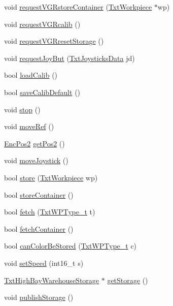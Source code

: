 \begin{DoxyCompactItemize}
\item 
void \hyperlink{classft_1_1_txt_high_bay_warehouse_a4321b39920184a1147017651286735dc}{request\+V\+G\+Rstore\+Container} (\hyperlink{classft_1_1_txt_workpiece}{Txt\+Workpiece} $\ast$wp)
\item 
void \hyperlink{classft_1_1_txt_high_bay_warehouse_a6556c4e1b0c1694a4e791f8bd66a6a11}{request\+V\+G\+Rcalib} ()
\item 
void \hyperlink{classft_1_1_txt_high_bay_warehouse_a1d0b36be0177afb2675db7354240d27a}{request\+V\+G\+Rreset\+Storage} ()
\item 
void \hyperlink{classft_1_1_txt_high_bay_warehouse_a54653fd5c84c7cbd7fd684511f4ca800}{request\+Joy\+But} (\hyperlink{classft_1_1_txt_joysticks_data}{Txt\+Joysticks\+Data} jd)
\item 
bool \hyperlink{classft_1_1_txt_high_bay_warehouse_a2a08665e626da0c946461e5df89937c2}{load\+Calib} ()
\item 
bool \hyperlink{classft_1_1_txt_high_bay_warehouse_ae6deca6a80680d0d563fde5296b618cb}{save\+Calib\+Default} ()
\item 
void \hyperlink{classft_1_1_txt_high_bay_warehouse_a486b766d3f8f11a023daee496429faf0}{stop} ()
\item 
void \hyperlink{classft_1_1_txt_high_bay_warehouse_ae18724814f18d63433a00058622c29bd}{move\+Ref} ()
\item 
\hyperlink{classft_1_1_enc_pos2}{Enc\+Pos2} \hyperlink{classft_1_1_txt_high_bay_warehouse_a1fcf0e88756f2665516b7e15cf4176a4}{get\+Pos2} ()
\item 
void \hyperlink{classft_1_1_txt_high_bay_warehouse_aa73dd2693ee1c2487509b7c82d9a1009}{move\+Joystick} ()
\item 
bool \hyperlink{classft_1_1_txt_high_bay_warehouse_afed1cdc629d97c3776acd48fbc737780}{store} (\hyperlink{classft_1_1_txt_workpiece}{Txt\+Workpiece} wp)
\item 
bool \hyperlink{classft_1_1_txt_high_bay_warehouse_adf0ee6b1f8ef44a317fb360de6ad0cc6}{store\+Container} ()
\item 
bool \hyperlink{classft_1_1_txt_high_bay_warehouse_aa7c22f329269e06c5f8c7bfa8ef16271}{fetch} (\hyperlink{namespaceft_a2d5bf01b2da29de3c061682f3195b5b2}{Txt\+W\+P\+Type\+\_\+t} t)
\item 
bool \hyperlink{classft_1_1_txt_high_bay_warehouse_adde09600f4be96e6abea1d9c9a3b1870}{fetch\+Container} ()
\item 
bool \hyperlink{classft_1_1_txt_high_bay_warehouse_afbf800311ac3a0a1850dcde132b3f1e1}{can\+Color\+Be\+Stored} (\hyperlink{namespaceft_a2d5bf01b2da29de3c061682f3195b5b2}{Txt\+W\+P\+Type\+\_\+t} c)
\item 
void \hyperlink{classft_1_1_txt_high_bay_warehouse_ad8900c4005609dde97e2162ef9f72031}{set\+Speed} (int16\+\_\+t s)
\item 
\hyperlink{classft_1_1_txt_high_bay_warehouse_storage}{Txt\+High\+Bay\+Warehouse\+Storage} $\ast$ \hyperlink{classft_1_1_txt_high_bay_warehouse_a06282b2469dc0502af96453fcb7108af}{get\+Storage} ()
\item 
void \hyperlink{classft_1_1_txt_high_bay_warehouse_a84e16b16ed3b1244a8e6a639fb22d83f}{publish\+Storage} ()
\end{DoxyCompactItemize}
